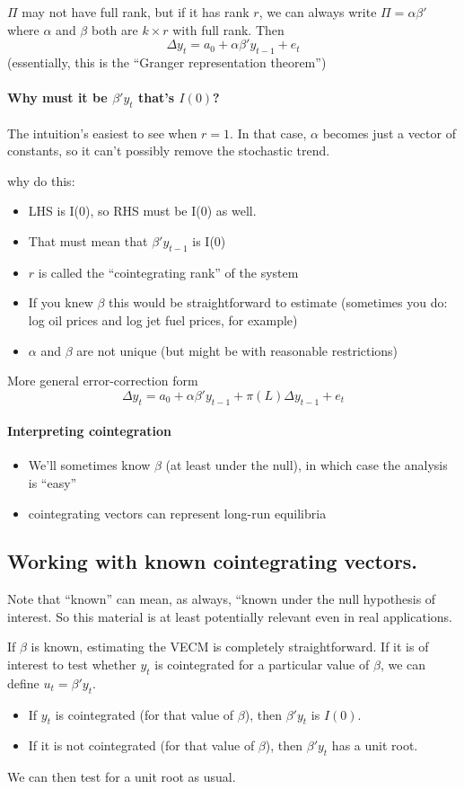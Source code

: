 $Π$ may not have full rank, but if it has rank $r$, we can always write $Π =
αβ'$ where $α$ and $β$ both are $k × r$ with full rank.
Then \[Δy_t = a_0 + αβ'y_{t-1} + e_t\]
(essentially, this is the ``Granger representation theorem'')

\paragraph{Why must it be $β'y_t$ that's $I(0)$?} The intuition's
easiest to see when $r=1$.  In that case, $α$ becomes just a vector of
constants, so it can't possibly remove the stochastic trend.  

why do this: 
\begin{itemize}
\item LHS is I(0), so RHS must be I(0) as well.
\item That must mean that $β'y_{t-1}$ is I(0)
\item $r$ is called the ``cointegrating rank'' of the system
\item If you knew $β$ this would be straightforward to estimate
  (sometimes you do: log oil prices and log jet fuel prices, for
  example)
\item $α$ and $β$ are not unique (but might be with reasonable
  restrictions)
\end{itemize}

More general error-correction form
\[Δ y_t = a_0 + αβ' y_{t-1} + π(L) Δ y_{t-1} + e_t\]

\paragraph{Interpreting cointegration}
\begin{itemize}
\item We'll sometimes know $β$ (at least under the null), in which
  case the analysis is ``easy''
\item cointegrating vectors can represent long-run equilibria
\end{itemize}

\subsection{Working with known cointegrating vectors.}

Note that ``known'' can mean, as always, ``known under the null
hypothesis of interest.  So this material is at least potentially
relevant even in real applications.

If $β$ is known, estimating the VECM is completely straightforward.
If it is of interest to test whether $y_t$ is cointegrated for a
particular value of $β$, we can define $u_t = β'y_t$.
\begin{itemize}
\item If $y_t$ is cointegrated (for that value of $β$), then $β'y_t$
  is $I(0)$.
\item If it is not cointegrated (for that value of $β$), then $β'y_t$
  has a unit root.
\end{itemize}
We can then test for a unit root as usual.

